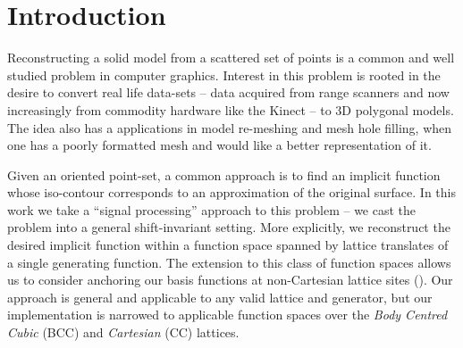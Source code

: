 \section{Introduction}

\label{sec:intro}
Reconstructing a solid model from a scattered set of points is a common and well studied problem in computer graphics. Interest in this problem is rooted in the desire to convert real life data-sets -- data acquired from range scanners and now increasingly from commodity hardware like the Kinect -- to 3D polygonal models. The idea also has a applications in model re-meshing and mesh hole filling, when one has a poorly formatted mesh and would like a better representation of it. 

Given an oriented point-set, a common approach is to find an implicit function whose iso-contour corresponds to an approximation of the original surface. In this work we take a ``signal processing'' approach to this problem -- we cast the problem into a general shift-invariant setting. More explicitly, we reconstruct the desired implicit function within a function space spanned by lattice translates of a single generating function. The extension to this class of function spaces allows us to consider anchoring our basis functions at non-Cartesian lattice sites (). Our approach is general and applicable to any valid lattice and generator, but our implementation is narrowed to applicable function spaces over the \emph{Body Centred Cubic} (BCC) and \emph{Cartesian} (CC) lattices.

